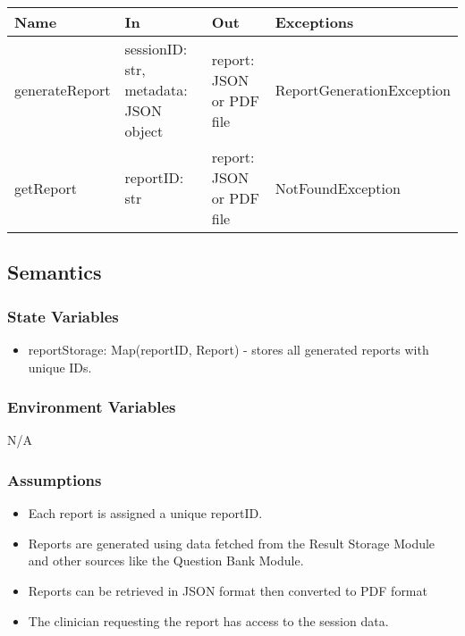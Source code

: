 \documentclass[12pt, titlepage]{article}
\begin{document}
\begin{center}
\begin{tabular}{p{3cm} p{4cm} p{4cm} p{5cm}}
\hline
\textbf{Name} & \textbf{In} & \textbf{Out} & \textbf{Exceptions} \\
\hline
generateReport & \raggedright\arraybackslash sessionID: str, metadata: JSON object & \raggedright\arraybackslash report: JSON or PDF file & \raggedright\arraybackslash ReportGenerationException \\
\hline
getReport & \raggedright\arraybackslash reportID: str & \raggedright\arraybackslash report: JSON or PDF file & \raggedright\arraybackslash NotFoundException \\
\hline
\end{tabular}
\end{center}

\subsection{Semantics}

\subsubsection{State Variables}

\begin{itemize}
\item reportStorage: Map(reportID, Report) - stores all generated reports with unique IDs.
\end{itemize}

\subsubsection{Environment Variables}

N/A

\subsubsection{Assumptions}

\begin{itemize}
\item Each report is assigned a unique reportID.
\item Reports are generated using data fetched from the Result Storage Module and other sources like the Question Bank Module.
\item Reports can be retrieved in JSON format then converted to PDF format
\item The clinician requesting the report has access to the session data.
\end{itemize}
\end{document}
